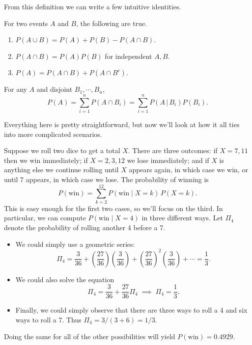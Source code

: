 \documentclass[../m157main.tex]{subfiles}
\begin{document}
From this definition we can write a few intuitive identities.

\begin{theorem}
    For two events $A$ and $B$, the following are true.
    \begin{enumerate}[label=(\alph*)]
        \item $P(A \cup B) = P(A) + P(B) - P(A \cap B)$.
        \item $P(A \cap B) = P(A)P(B)$ for independent $A,B$.
        \item $P(A) = P(A \cap B) + P(A \cap B^c)$.
    \end{enumerate}
\end{theorem}

\begin{theorem}
    For any $A$ and disjoint $B_1, \cdots, B_n$,
    \[ P(A) = \sum_{i=1}^{n} P(A \cap B_i) = \sum_{i=1}^{n} P(A \,|\, B_i) P(B_i). \]
\end{theorem}

Everything here is pretty straightforward, but now we'll look at how it all ties into more complicated scenarios.

\begin{example}[Craps]
    Suppose we roll two dice to get a total $X$.
    There are three outcomes:
    if $X = 7,11$ then we win immediately; if $X = 2,3,12$ we lose immediately; and if $X$ is anything else we continue rolling until $X$ appears again, in which case we win, or until 7 appears, in which case we lose.
    The probability of winning is
    \[ P(\textrm{win}) = \sum_{k=2}^{12} P(\textrm{win} \; | \; X = k) \, P(X = k). \]
    This is easy enough for the first two cases, so we'll focus on the third.
    In particular, we can compute $P(\textrm{win} \; | \; X = 4)$ in three different ways.
    Let $\Pi_4$ denote the probability of rolling another 4 before a 7.
    \begin{itemize}
        \item We could simply use a geometric series:
        \[ \Pi_4 = \frac{3}{36} + \left( \frac{27}{36} \right) \left( \frac{3}{36} \right) + \left( \frac{27}{36} \right)^2 \left( \frac{3}{36} \right) + \cdots = \frac{1}{3}. \]

        \item We could also solve the equation
        \[ \Pi_4 = \frac{3}{36} + \frac{27}{36} \Pi_4 \;\implies\; \Pi_4 = \frac{1}{3}. \]

        \item Finally, we could simply observe that there are three ways to roll a 4 and six ways to roll a 7.
        Thus $\Pi_4 = 3 / (3 + 6) = 1 / 3$.
    \end{itemize}
    Doing the same for all of the other possibilities will yield $P(\textrm{win}) = 0.49\overline{29}$.
\end{example}
\end{document}
